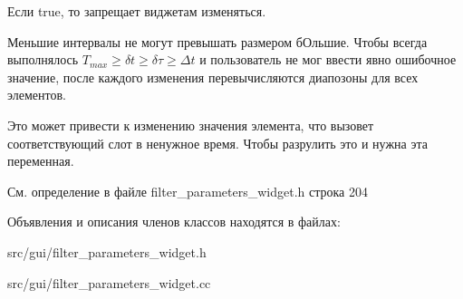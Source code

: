 Если true, то запрещает виджетам изменяться.

Меньшие интервалы не могут превышать размером бОльшие. Чтобы всегда выполнялось $T_{max} \geq \delta t \geq \delta \tau \geq \Delta t$ и пользователь не мог ввести явно ошибочное значение, после каждого изменения перевычисляются диапозоны для всех элементов.

Это может привести к изменению значения элемента, что вызовет соответствующий слот в ненужное время. Чтобы разрулить это и нужна эта переменная. 

См. определение в файле filter\+\_\+parameters\+\_\+widget.\+h строка 204



Объявления и описания членов классов находятся в файлах\+:\begin{DoxyCompactItemize}
\item 
src/gui/filter\+\_\+parameters\+\_\+widget.\+h\item 
src/gui/filter\+\_\+parameters\+\_\+widget.\+cc\end{DoxyCompactItemize}

